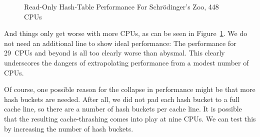 \begin{figure}[tb]
\centering
{}
\caption{Read-Only Hash-Table Performance For Schr\"odinger's Zoo, 448 CPUs}
\label{fig:datastruct:Read-Only Hash-Table Performance For Schroedinger's Zoo; 448 CPUs}
\end{figure}

And things only get worse with more CPUs, as can be seen in
Figure~\ref{fig:datastruct:Read-Only Hash-Table Performance For Schroedinger's Zoo; 448 CPUs}.
We do not need an additional line to show ideal performance: The performance
for 29~CPUs and beyond is all too clearly worse than abysmal.
This clearly underscores the dangers of extrapolating performance from a
modest number of CPUs.

Of course, one possible reason for the collapse in performance might be
that more hash buckets are needed.
After all, we did not pad each hash bucket to a full cache line, so
there are a number of hash buckets per cache line.
It is possible that the resulting cache-thrashing comes into play at
nine CPUs.
We can test this by increasing the number of hash buckets.

\QuickQuizEnd


